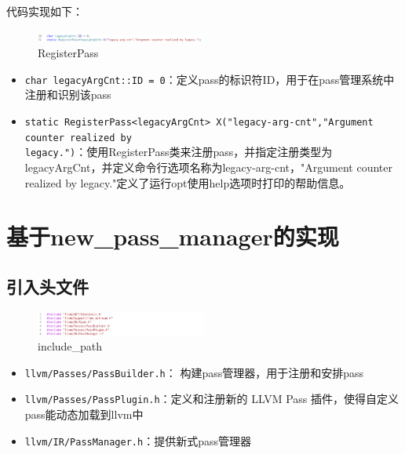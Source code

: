 \documentclass[11pt, a4paper, oneside,UTF8]{ctexart}
\begin{document}
代码实现如下：

\begin{figure}[h]
    \centering
    \includegraphics[width=0.5\textwidth]{./figure/legacy_3.png}
    \caption{RegisterPass}
    \label{figure:1.3}
\end{figure}

\begin{itemize}[before=]
    \setlength{\itemsep}{0em}
    \item \texttt{char legacyArgCnt::ID = 0}：定义pass的标识符ID，用于在pass管理系统中注册和识别该pass
    \item \texttt{static RegisterPass<legacyArgCnt> X("legacy-arg-cnt","Argument counter realized by \\legacy.")}：使用RegisterPass类来注册pass，并指定注册类型为legacyArgCnt，并定义命令行选项名称为legacy-arg-cnt，"Argument counter realized by legacy."定义了运行opt使用help选项时打印的帮助信息。
\end{itemize}

\section{基于new\_pass\_manager的实现}

\subsection{引入头文件}

\begin{figure}[h]
    \centering
    \includegraphics[width=0.5\textwidth]{./figure/new_1.png}
    \caption{include\_path}
    \label{figure:2.1}
\end{figure}

\begin{itemize}[before=]
    \setlength{\itemsep}{0em}
    \item \texttt{llvm/Passes/PassBuilder.h}： 构建pass管理器，用于注册和安排pass
    \item \texttt{llvm/Passes/PassPlugin.h}：定义和注册新的 LLVM Pass 插件，使得自定义pass能动态加载到llvm中
    \item \texttt{llvm/IR/PassManager.h}：提供新式pass管理器
\end{itemize}
\end{document}
